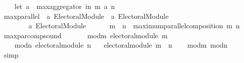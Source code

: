 \begin{isabellebody}
\ \ \ \ {\isacharparenleft}{\kern0pt}let\ a\ {\isacharequal}{\kern0pt}\ max{\isacharunderscore}{\kern0pt}aggregator\ in\ {\isacharparenleft}{\kern0pt}m\ {\isasymparallel}\isactrlsub a\ n{\isacharparenright}{\kern0pt}{\isacharparenright}{\kern0pt}{\isachardoublequoteclose}\isanewline
\isanewline
{}\isamarkupfalse%
\ max{\isacharunderscore}{\kern0pt}parallel\ {\isacharcolon}{\kern0pt}{\isacharcolon}{\kern0pt}\ {\isachardoublequoteopen}{\isacharprime}{\kern0pt}a\ Electoral{\isacharunderscore}{\kern0pt}Module\ {\isasymRightarrow}\ {\isacharprime}{\kern0pt}a\ Electoral{\isacharunderscore}{\kern0pt}Module\ {\isasymRightarrow}\isanewline
\ \ \ \ \ \ \ \ {\isacharprime}{\kern0pt}a\ Electoral{\isacharunderscore}{\kern0pt}Module{\isachardoublequoteclose}\ {\isacharparenleft}{\kern0pt}\ {\isachardoublequoteopen}{\isasymparallel}\isactrlsub {\isasymup}{\isachardoublequoteclose}\ {}{}{\isacharparenright}{\kern0pt}\ \isanewline
\ \ {\isachardoublequoteopen}m\ {\isasymparallel}\isactrlsub {\isasymup}\ n\ {\isacharequal}{\kern0pt}{\isacharequal}{\kern0pt}\ maximum{\isacharunderscore}{\kern0pt}parallel{\isacharunderscore}{\kern0pt}composition\ m\ n{\isachardoublequoteclose}%
\isadelimdocument
%
\endisadelimdocument
%
\isatagdocument
%
\isamarkuptrue%
%
\endisatagdocument
{\isafolddocument}%
%
\isadelimdocument
%
\endisadelimdocument
{}\isamarkupfalse%
\ max{\isacharunderscore}{\kern0pt}par{\isacharunderscore}{\kern0pt}comp{\isacharunderscore}{\kern0pt}sound{\isacharcolon}{\kern0pt}\isanewline
\ \ \isanewline
\ \ \ \ mod{\isacharunderscore}{\kern0pt}m{\isacharcolon}{\kern0pt}\ {\isachardoublequoteopen}electoral{\isacharunderscore}{\kern0pt}module\ m{\isachardoublequoteclose}\ \isanewline
\ \ \ \ mod{\isacharunderscore}{\kern0pt}n{\isacharcolon}{\kern0pt}\ {\isachardoublequoteopen}electoral{\isacharunderscore}{\kern0pt}module\ n{\isachardoublequoteclose}\isanewline
\ \ \ {\isachardoublequoteopen}electoral{\isacharunderscore}{\kern0pt}module\ {\isacharparenleft}{\kern0pt}m\ {\isasymparallel}\isactrlsub {\isasymup}\ n{\isacharparenright}{\kern0pt}{\isachardoublequoteclose}\isanewline
%
\isadelimproof
\ \ %
\endisadelimproof
%
\isatagproof
{}\isamarkupfalse%
\ mod{\isacharunderscore}{\kern0pt}m\ mod{\isacharunderscore}{\kern0pt}n\isanewline
\ \ \isamarkupfalse%
\ simp%
\endisatagproof
{\isafoldproof}%
%
\isadelimproof
%
\endisadelimproof
%
\isadelimdocument
%

\end{isabellebody}

